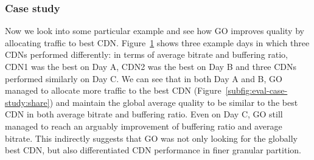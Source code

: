 \subsubsection{Case study}
Now we look into some particular example and see how GO improves quality by allocating traffic to best CDN. Figure~\ref{fig:eval-case-study} shows three example days in which three CDNs performed differently: in terms of average bitrate and buffering ratio, CDN1 was the best on Day A, CDN2 was the best on Day B and three CDNs performed similarly on Day C. We can see that in both Day A and B, GO managed to allocate more traffic to the best CDN (Figure~\ref{subfig:eval-case-study:share}) and maintain the global average quality to be similar to the best CDN in both average bitrate and buffering ratio. Even on Day C, GO still managed to reach an arguably improvement of buffering ratio and average bitrate. This indirectly suggests that GO was not only looking for the globally best CDN, but also differentiated CDN performance in finer granular partition.


\begin{figure}[t!]
\centering
{}
\label{fig:eval-case-study}
\end{figure}



